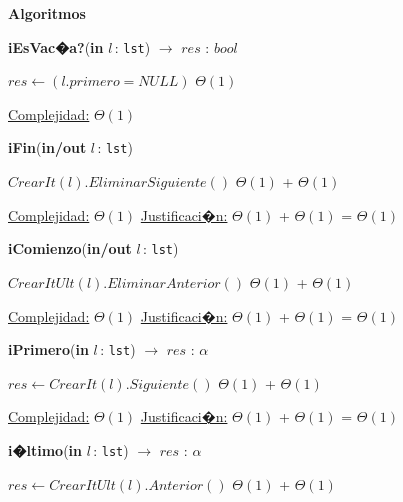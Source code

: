 \documentclass[a4paper,10pt]{article}
\let\TipoVariable=\texttt
\let\ModificadorArgumento=\textbf
\newcommand{\In}[2]{\ModificadorArgumento{in} \ensuremath{#1}\,: \TipoVariable{#2}\xspace}
\newcommand{\Inout}[2]{\ModificadorArgumento{in/out} \ensuremath{#1}\,: \TipoVariable{#2}\xspace}
\newenvironment{Algoritmos}{%
  \vspace*{2ex}%
  \noindent\textbf{\Large Algoritmos}%
  \vspace*{2ex}%
}{}
\begin{document}
\begin{Algoritmos}
\begin{algorithm}[H]{\textbf{iEsVac�a?}(\In{l}{lst}) $\to$ $res$ : $bool$}
	\begin{algorithmic}[1]
			 \State $res \gets (l.primero = NULL)$	 \Comment $\Theta(1)$
    
			\medskip
			\Statex \underline{Complejidad:} $\Theta(1)$
    	\end{algorithmic}
\end{algorithm}	


\begin{algorithm}[H]{\textbf{iFin}(\Inout{l}{lst})}
	\begin{algorithmic}[1]
			 \State $CrearIt(l).EliminarSiguiente()$	\Comment $\Theta(1)$ + $\Theta(1)$
			 
			\medskip
			\Statex \underline{Complejidad:} $\Theta(1)$
			\Statex \underline{Justificaci�n:} $\Theta(1)$ + $\Theta(1)$ = $\Theta(1)$
    	\end{algorithmic}
\end{algorithm}	

	
\begin{algorithm}[H]{\textbf{iComienzo}(\Inout{l}{lst})}	
	\begin{algorithmic}[1]
			 \State $CrearItUlt(l).EliminarAnterior()$	\Comment $\Theta(1)$ + $\Theta(1)$
    	    
			\medskip
			\Statex \underline{Complejidad:} $\Theta(1)$
			\Statex \underline{Justificaci�n:} $\Theta(1)$ + $\Theta(1)$ = $\Theta(1)$
			 
    	\end{algorithmic}
\end{algorithm}	
	
\begin{algorithm}[H]{\textbf{iPrimero}(\In{l}{lst}) $\to$ $res$ : $\alpha$}	
	\begin{algorithmic}[1]
		 \State $res \gets CrearIt(l).Siguiente()$	\Comment $\Theta(1)$ + $\Theta(1)$

		\medskip
		\Statex \underline{Complejidad:} $\Theta(1)$
		\Statex \underline{Justificaci�n:} $\Theta(1)$ + $\Theta(1)$ = $\Theta(1)$
    \end{algorithmic}
\end{algorithm}	
	
\begin{algorithm}[H]{\textbf{i�ltimo}(\In{l}{lst}) $\to$ $res$ : $\alpha$}	
	\begin{algorithmic}[1]
			 \State $res \gets CrearItUlt(l).Anterior()$	\Comment $\Theta(1)$ + $\Theta(1)$
    	    	    

\end{algorithmic}
\end{algorithm}
\end{Algoritmos}
\end{document}
